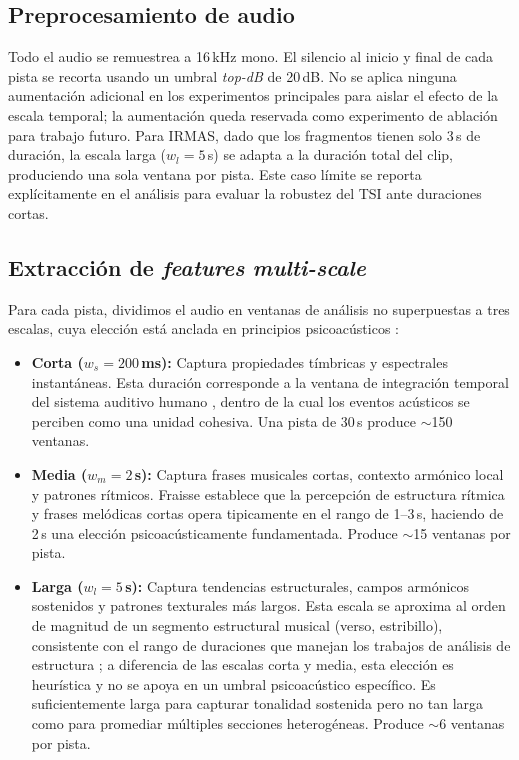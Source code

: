 \documentclass[conference]{IEEEtran}
\begin{document}
\subsection{Preprocesamiento de audio}

Todo el audio se remuestrea a 16\,kHz mono.
El silencio al inicio y final de cada pista se recorta usando un umbral \textit{top-dB} de 20\,dB.
No se aplica ninguna aumentación adicional en los experimentos principales para aislar el efecto de la escala temporal; la aumentación queda reservada como experimento de ablación para trabajo futuro.
Para IRMAS, dado que los fragmentos tienen solo 3\,s de duración, la escala larga ($w_l = 5$\,s) se adapta a la duración total del clip, produciendo una sola ventana por pista. Este caso límite se reporta explícitamente en el análisis para evaluar la robustez del TSI ante 
duraciones cortas.

\subsection{Extracción de \textit{features} \textit{multi-scale}}
Para cada pista, dividimos el audio en ventanas de análisis no superpuestas a tres escalas, cuya elección está anclada en principios 
psicoacústicos \cite{bregman1994auditory, fraisse1978time}:

\begin{itemize}
    \item \textbf{Corta ($w_s = 200$\,ms):} Captura propiedades tímbricas y espectrales instantáneas. Esta duración corresponde a la ventana de integración temporal del sistema auditivo humano 
    \cite{bregman1994auditory}, dentro de la cual los eventos acústicos se perciben como una unidad cohesiva. Una pista de 30\,s produce $\sim$150 ventanas.

    \item \textbf{Media ($w_m = 2$\,s):} Captura frases musicales cortas, contexto armónico local y patrones rítmicos. Fraisse \cite{fraisse1978time} establece que la percepción de estructura rítmica y frases melódicas cortas opera tipicamente en el rango de 
    1--3\,s, haciendo de 2\,s una elección psicoacústicamente fundamentada. Produce $\sim$15 ventanas por pista.

    \item \textbf{Larga ($w_l = 5$\,s):} Captura tendencias estructurales, campos armónicos sostenidos y patrones texturales más largos.
    Esta escala se aproxima al orden de magnitud de un segmento estructural musical (verso, estribillo), consistente con el rango de duraciones que manejan los trabajos de análisis de estructura \cite{serra2014unsupervised}; a diferencia de las escalas corta y media, esta elección es heurística y no se apoya en un umbral psicoacústico específico. Es suficientemente larga para capturar tonalidad sostenida pero no tan
    larga como para promediar múltiples secciones heterogéneas. Produce $\sim$6 ventanas por pista.
\end{itemize}
\end{document}
